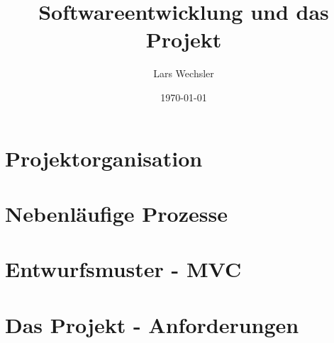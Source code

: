 \documentclass{article}
\author{Lars Wechsler}
\title{Softwareentwicklung und \textbf{das Projekt}}
\date{\today}
\begin{document}
\maketitle
\newpage
\tableofcontents
\newpage 

\section{Projektorganisation}



\newpage

\section{Nebenläufige Prozesse}


\newpage

\section{Entwurfsmuster - MVC}


\newpage 

\section{Das Projekt - Anforderungen}

\end{document}
